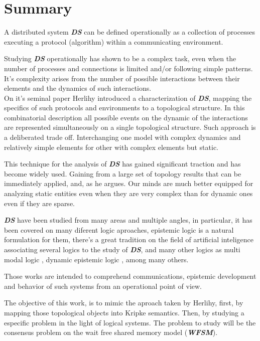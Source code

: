 \documentclass{tufte-book} %
\newcommand{\ds}{\textbf{\textit{DS}}\xspace}
\newcommand{\sh}{\textbf{\textit{WFSM}}\xspace}
\begin{document}
\chapter{Summary} 

A distributed system \ds can be defined operationally as a collection of 
processes executing a protocol (algorithm) within a communicating environment.

Studying \ds operationally has shown to be a complex task, even when the number 
of processes and connections is limited and/or following simple patterns. 
It's complexity arises from the number of possible interactions between their 
elements and the dynamics of such interactions.\\

On it's seminal paper \cite{Herlihy1999} Herlihy  introduced a characterization of \ds, 
mapping the specifics of such protocols and environments to a topological structure.
In this combinatorial description all possible events on the dynamic of the interactions 
are represented simultaneously on a single topological structure.
Such approach is a deliberated trade off. Interchanging one model with complex 
dynamics and relatively simple elements for other with complex elements but static.

This technique for the analysis of \ds has gained significant traction 
and has become widely used.
Gaining from a large set of topology results that can be immediately applied, and, as 
he argues. Our minds are much better equipped for analyzing static entities even when they are very complex than for dynamic ones even if they are sparse.

\ds have been studied from many areas and multiple angles, in particular, it has been 
covered on many diferent logic aproaches, epistemic logic \cite{Meyer:1995} is a natural formulation for 
them, there's a great tradition on the field of artificial inteligence associating several logics to the study of \ds \cite{HandbookAI1}, and many other logics as multi modal logic \cite{Hintikka1962}, dynamic epistemic logic \cite{Ditmarsch:2007}, among many others.
\newpage

Those works are intended to comprehend communications, epistemic development and 
behavior of such systems from an operational point of view.

The objective of this work, is to mimic the aproach taken by Herlihy, first, by mapping those topological objects into Kripke semantics. Then, by studying a especific problem in the light of logical systems. The problem to study will be the consensus problem on the wait free shared memory model (\sh).
\end{document}
